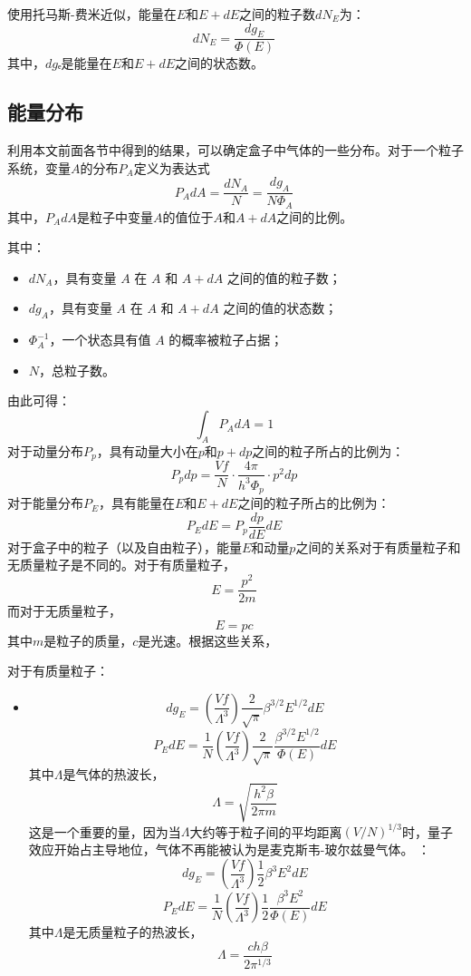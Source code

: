 使用托马斯-费米近似，能量在\(E\)和\(E+dE\)之间的粒子数\(dN_E\)为：
\[
dN_E = \frac{dg_E}{\Phi(E)}~
\]
其中，\(dg\)ₑ是能量在\(E\)和\(E+dE\)之间的状态数。
\subsection{能量分布}  
利用本文前面各节中得到的结果，可以确定盒子中气体的一些分布。对于一个粒子系统，变量\( A \)的分布\( P_A \)定义为表达式  
\[
P_A dA = \frac{dN_A}{N} = \frac{dg_A}{N \Phi_A}~
\]
其中，\( P_A dA \)是粒子中变量\( A \)的值位于\( A \)和\( A + dA \)之间的比例。

其中：
\begin{itemize}
\item \( dN_A \)，具有变量 \( A \) 在 \( A \) 和 \( A + dA \) 之间的值的粒子数；
\item \( dg_A \)，具有变量 \( A \) 在 \( A \) 和 \( A + dA \) 之间的值的状态数；
\item \( \Phi_A^{-1} \)，一个状态具有值 \( A \) 的概率被粒子占据；
\item \( N \)，总粒子数。
\end{itemize}
由此可得：
\[
\int_A P_A dA = 1~
\]
对于动量分布\( P_p \)，具有动量大小在\( p \)和\( p + dp \)之间的粒子所占的比例为：
\[
P_p dp = \frac{Vf}{N} \cdot \frac{4\pi}{h^3 \Phi_p} \cdot p^2 dp~
\]
对于能量分布\( P_E \)，具有能量在\( E \)和\( E+dE \)之间的粒子所占的比例为：
\[
P_E dE = P_p \frac{dp}{dE} dE~
\]
对于盒子中的粒子（以及自由粒子），能量\( E \)和动量\( p \)之间的关系对于有质量粒子和无质量粒子是不同的。对于有质量粒子，
\[
E = \frac{p^2}{2m}~
\]
而对于无质量粒子，
\[
E = pc~
\]
其中\( m \)是粒子的质量，\( c \)是光速。根据这些关系，

对于有质量粒子：
\begin{itemize}
\item 
\[
dg_E = \left( \frac{Vf}{\Lambda^3} \right) \frac{2}{\sqrt{\pi}} \beta^{3/2} E^{1/2} dE~
\]
\[
P_E dE = \frac{1}{N} \left( \frac{Vf}{\Lambda^3} \right) \frac{2}{\sqrt{\pi}} \frac{\beta^{3/2} E^{1/2}}{\Phi(E)} dE~
\]
其中\( \Lambda \)是气体的热波长，
\[
\Lambda = \sqrt{\frac{h^2 \beta}{2\pi m}}~
\]
这是一个重要的量，因为当\( \Lambda \)大约等于粒子间的平均距离\( (V/N)^{1/3} \)时，量子效应开始占主导地位，气体不再能被认为是麦克斯韦-玻尔兹曼气体。
：
\[
dg_E = \left( \frac{Vf}{\Lambda^3} \right) \frac{1}{2} \beta^3 E^2 dE~
\]
\[
P_E dE = \frac{1}{N} \left( \frac{Vf}{\Lambda^3} \right) \frac{1}{2} \frac{\beta^3 E^2}{\Phi(E)} dE~
\]
其中\( \Lambda \)是无质量粒子的热波长，
\[
\Lambda = \frac{ch\beta}{2 \pi^{1/3}}~
\]
\end{itemize}
